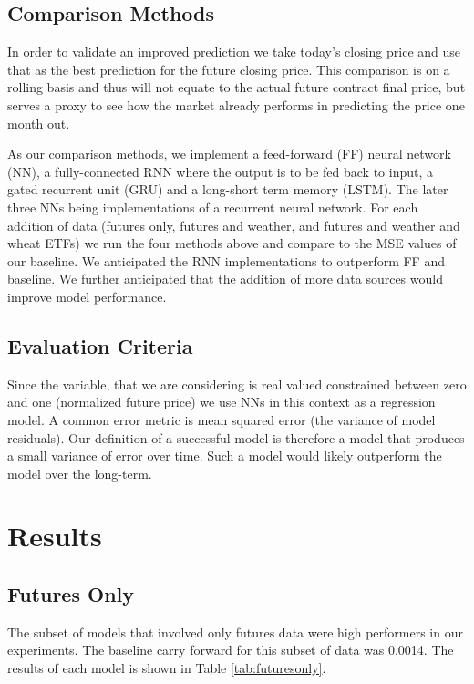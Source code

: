 \documentclass[twoside,11pt]{article}
\begin{document}
\subsection{Comparison Methods}

In order to validate an improved prediction we take today's closing price and use that as the best prediction for the future closing price. This comparison is on a rolling basis and thus will not equate to the actual future contract final price, but serves a proxy to see how the market already performs  in predicting the price one month out. 

As our comparison methods, we implement a feed-forward (FF) neural network (NN), a fully-connected RNN where the output is to be fed back to input, a gated recurrent unit (GRU) and a long-short term memory (LSTM). The later three NNs being implementations of a recurrent neural network. For each addition of data (futures only, futures and weather, and futures and weather and wheat ETFs) we run the four methods above and compare to the MSE values of our baseline. We anticipated the RNN implementations to outperform FF and baseline. We further anticipated that the addition of more data sources would improve model performance. 

\subsection{Evaluation Criteria}

Since the variable, that we are considering is real valued constrained between zero and one (normalized future price) we use NNs in this context as a regression model. A common error metric is mean squared error (the variance of model residuals). Our definition of a successful model is therefore a model that produces a small variance of error over time. Such a model would likely outperform the model over the long-term. 

\section{Results} \label{results}

\subsection{Futures Only}

The subset of models that involved only futures data were high performers in our experiments. The baseline carry forward for this subset of data was 0.0014. The results of each model is shown in Table \ref{tab:futuresonly}.
\end{document}
